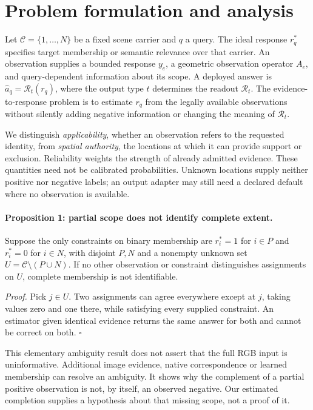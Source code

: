 \section{Problem formulation and analysis}
\label{sec:analysis}
Let $\mathcal C=\{1,\ldots,N\}$ be a fixed scene carrier and $q$ a query.
The ideal response $r_q^*$ specifies target membership or semantic relevance
over that carrier. An observation supplies a bounded response $y_e$, a geometric
observation operator $A_e$, and query-dependent information about its scope.
A deployed answer is $\widehat a_q=\mathcal R_t(r_q)$, where the output type $t$
determines the readout $\mathcal R_t$. The evidence-to-response problem is to
estimate $r_q$ from the legally available observations without silently adding
negative information or changing the meaning of $\mathcal R_t$.

We distinguish \emph{applicability}, whether an observation refers to the
requested identity, from \emph{spatial authority}, the locations at which it
can provide support or exclusion. Reliability weights the strength of already
admitted evidence. These quantities need not be calibrated probabilities.
Unknown locations supply neither positive nor negative labels; an output
adapter may still need a declared default where no observation is available.

\paragraph{Proposition 1: partial scope does not identify complete extent.}
Suppose the only constraints on binary membership are $r_i^*=1$ for $i\in P$
and $r_i^*=0$ for $i\in N$, with disjoint $P,N$ and a nonempty unknown set
$U=\mathcal C\setminus(P\cup N)$. If no other observation or constraint
distinguishes assignments on $U$, complete membership is not identifiable.

\emph{Proof.} Pick $j\in U$. Two assignments can agree everywhere except at
$j$, taking values zero and one there, while satisfying every supplied
constraint. An estimator given identical evidence returns the same answer
for both and cannot be correct on both. $\square$

This elementary ambiguity result does not assert that the full RGB input is
uninformative. Additional image evidence, native correspondence or learned
membership can resolve an ambiguity. It shows why the complement of a partial
positive observation is not, by itself, an observed negative. Our estimated
completion supplies a hypothesis about that missing scope, not a proof of it.

